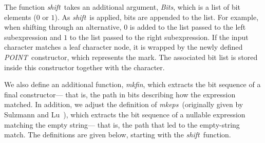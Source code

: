 \documentclass[12pt]{article}
\newcommand{\shift}{\textit{shift}}
\newcommand{\mkeps}{\textit{mkeps}}
\newcommand{\Bits}{\textit{Bits}}
\newcommand{\POINT}{\textit{POINT}}
\newcommand{\mkfin}{\textit{mkfin}}
\begin{document}
The function \shift\ takes an additional argument, \Bits, which is a list of bit elements ($0$ or $1$).  
As \shift\ is applied, bits are appended to the list.  
For example, when shifting through an alternative, $0$ is added to the list passed to the left subexpression 
and $1$ to the list passed to the right subexpression.  
If the input character matches a leaf character node, it is wrapped by the newly defined \POINT\ constructor, 
which represents the mark.  
The associated bit list is stored inside this constructor together with the character.  

We also define an additional function, \mkfin, which extracts the bit sequence of a final constructor--- 
that is, the path in bits describing how the expression matched.  
In addition, we adjust the definition of \mkeps\ (originally given by Sulzmann and Lu~\cite{Sulzmann2014}),  
which extracts the bit sequence of a nullable expression matching the empty string--- 
that is, the path that led to the empty-string match.  
The definitions are given below, starting with the \shift\ function.  
\end{document}
